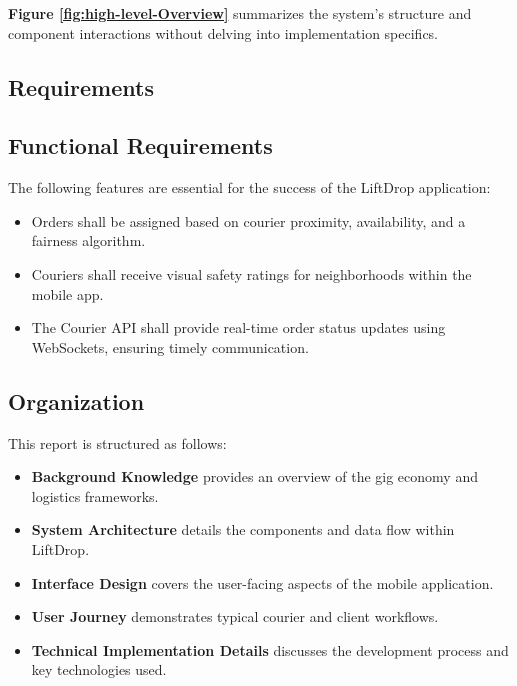 \noindent
\textbf{Figure \ref{fig:high-level-Overview}} summarizes the system's structure and component interactions without delving into implementation specifics.

\subsection{Requirements}

\subsection*{Functional Requirements}

The following features are essential for the success of the LiftDrop application:

\begin{itemize}
    \item Orders shall be assigned based on courier proximity, availability, and a fairness algorithm.
    \item Couriers shall receive visual safety ratings for neighborhoods within the mobile app.
    \item The Courier API shall provide real-time order status updates using WebSockets, ensuring timely communication.
\end{itemize}

\subsection{Organization}

This report is structured as follows: 
\begin{itemize}
    \item \textbf{Background Knowledge} provides an overview of the gig economy and logistics frameworks.
    \item \textbf{System Architecture} details the components and data flow within LiftDrop.
    \item \textbf{Interface Design} covers the user-facing aspects of the mobile application.
    \item \textbf{User Journey} demonstrates typical courier and client workflows.
    \item \textbf{Technical Implementation Details} discusses the development process and key technologies used.
\end{itemize}
